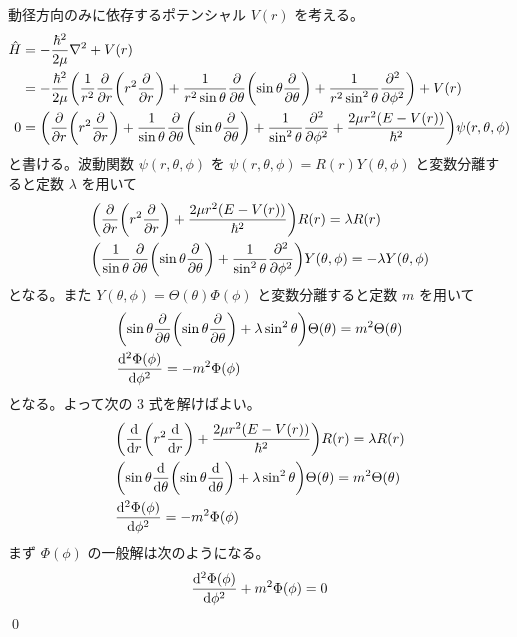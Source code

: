 \documentclass[uplatex,dvipdfmx,a4paper,11pt]{jlreq}
\makeatletter
\numberwithin{equation}{section}
\theoremstyle{definition}
\renewenvironment{proof}[1][\proofname]{\par
  \normalfont
  \topsep6\p@\@plus6\p@ \trivlist
  \item[\hskip\labelsep{\bfseries #1}\@addpunct{\bfseries}]\ignorespaces\quad\par
}{%
  \qed\endtrivlist\@endpefalse
}
\renewcommand\proofname{証明}
\makeatother
\begin{document}
\begin{proof}
  動径方向のみに依存するポテンシャル $V(r)$ を考える。
  \begin{align}
    \hat{H} & = -\frac{\hbar^2}{2\mu}\laplacian + V(r)                                                                                                                                                       \\
            & = -\frac{\hbar^2}{2\mu}\qty(\frac{1}{r^2}\pdv{r}\qty(r^2\pdv{r}) + \frac{1}{r^2\sin\theta}\pdv{\theta}\qty(\sin\theta\pdv{\theta}) + \frac{1}{r^2\sin^2\theta}\pdv[2]{\phi}) + V(r)            \\
    0       & = \qty(\pdv{r}\qty(r^2\pdv{r}) + \frac{1}{\sin\theta}\pdv{\theta}\qty(\sin\theta\pdv{\theta}) + \frac{1}{\sin^2\theta}\pdv[2]{\phi} + \frac{2\mu r^2(E - V(r))}{\hbar^2})\psi(r, \theta, \phi)
  \end{align}
  と書ける。波動関数 $\psi(r, \theta, \phi)$ を $\psi(r, \theta, \phi) = R(r)Y(\theta, \phi)$ と変数分離すると定数 $\lambda$ を用いて
  \begin{align}
     & \qty(\pdv{r}\qty(r^2\pdv{r}) + \frac{2\mu r^2(E - V(r))}{\hbar^2})R(r) = \lambda R(r)                                                               \\
     & \qty(\frac{1}{\sin\theta}\pdv{\theta}\qty(\sin\theta\pdv{\theta}) + \frac{1}{\sin^2\theta}\pdv[2]{\phi}) Y(\theta, \phi) = -\lambda Y(\theta, \phi)
  \end{align}
  となる。また $Y(\theta, \phi) = \Theta(\theta)\Phi(\phi)$ と変数分離すると定数 $m$ を用いて
  \begin{align}
     & \qty(\sin\theta\pdv{\theta}\qty(\sin\theta\pdv{\theta}) + \lambda \sin^2\theta)\Theta(\theta) = m^2\Theta(\theta) \\
     & \dv[2]{\Phi(\phi)}{\phi} = -m^2\Phi(\phi)
  \end{align}
  となる。よって次の 3 式を解けばよい。
  \begin{align}
     & \qty(\dv{r}\qty(r^2\dv{r}) + \frac{2\mu r^2(E - V(r))}{\hbar^2})R(r) = \lambda R(r)                              \\
     & \qty(\sin\theta\dv{\theta}\qty(\sin\theta\dv{\theta}) + \lambda \sin^2\theta)\Theta(\theta)  = m^2\Theta(\theta) \\
     & \dv[2]{\Phi(\phi)}{\phi} = -m^2\Phi(\phi)
  \end{align}
  まず $\Phi(\phi)$ の一般解は次のようになる。
  \begin{align}
     & \dv[2]{\Phi(\phi)}{\phi} + m^2\Phi(\phi) = 0               \\

\end{align}
\end{proof}
\end{document}
